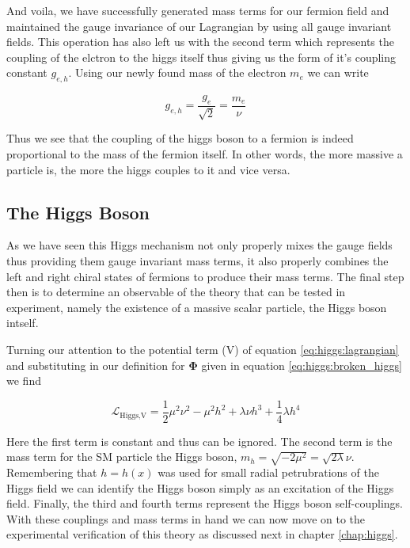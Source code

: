 And voila, we have successfully generated mass terms for our fermion field and
maintained the gauge invariance of our Lagrangian by using all gauge invariant
fields.  This operation has also left us with the second term which represents the coupling
of the elctron to the higgs itself thus giving us the form of it's coupling
constant $g_{e,h}$.  Using our newly found mass of the electron $m_{e}$ we can
write

\begin{equation}
g_{e,h} = \frac{g_{e}}{\sqrt{2}} = \frac{m_{e}}{\nu}
\end{equation}

Thus we see that the coupling of the higgs boson to a fermion is indeed
proportional to the mass of the fermion itself.  In other words, the more
massive a particle is, the more the higgs couples to it and vice versa.
 
\subsection{The Higgs Boson}

As we have seen this Higgs mechanism not only properly mixes the gauge fields
thus providing them gauge invariant mass terms, it also properly combines the
left and right chiral states of fermions to produce their mass terms.  The final
step then is to determine an observable of the theory that can be tested in
experiment, namely the existence of a massive scalar particle, the Higgs boson
intself.

Turning our attention to the potential term (V) of equation
\ref{eq:higgs:lagrangian} and substituting in our definition for
$\boldsymbol{\Phi}$ given in equation \ref{eq:higgs:broken_higgs} we find

\begin{equation}
\mathcal{L}_\text{Higgs,V} = \frac{1}{2} \mu^{2} \nu^{2} - \mu^{2} h^{2} +
\lambda \nu h^{3} + \frac{1}{4} \lambda h^{4}
\end{equation}

Here the first term is constant and thus can be ignored.  The second term is the
mass term for the SM particle the Higgs boson, $m_h = \sqrt{-2\mu^{2}} =
\sqrt{2\lambda}\nu$. Remembering that $h = h(x)$ was used for small radial
petrubrations of the Higgs field we can identify the Higgs boson simply as an
excitation of the Higgs field.  Finally, the third and fourth terms represent
the Higgs boson self-couplings.  With these couplings and mass terms in hand we
can now move on to the experimental verification of this theory as discussed
next in chapter \ref{chap:higgs}.

